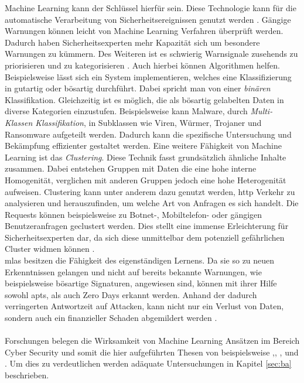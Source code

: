 \documentclass[
    12pt, %
    DIV10,
    ngerman, %
    a4paper, %
    oneside, %
    titlepage, %
    parskip=half, %
    headings=normal, %
    listof=totoc, %
    bibliography=totoc, %
    index=totoc, %
    captions=tableheading, %
    final %
]{scrreprt}
\begin{document}
Machine Learning kann der Schlüssel hierfür sein. Diese Technologie kann für die automatische Verarbeitung von Sicherheitsereignissen genutzt werden \parencite{Singla2019}. Gängige Warnungen können leicht von Machine Learning Verfahren überprüft werden. Dadurch haben Sicherheitsexperten mehr Kapazität sich um besondere Warnungen zu kümmern. Des Weiteren ist es schwierig Warnsignale zusehends zu priorisieren und zu kategorisieren \parencite{JoshuaSaxe2018}. Auch hierbei können Algorithmen helfen. Beispielsweise lässt sich ein System implementieren, welches eine Klassifizierung in gutartig oder bösartig durchführt. Dabei spricht man von einer \emph{binären} Klassifikation. Gleichzeitig ist es möglich, die als bösartig gelabelten Daten in diverse Kategorien einzustufen. Beispielsweise kann Malware, durch \emph{Multi-Klassen Klassifikation}, in Subklassen wie Viren, Würmer, Trojaner und Ransomware aufgeteilt werden. Dadurch kann die spezifische Untersuchung und Bekämpfung effizienter gestaltet werden. Eine weitere Fähigkeit von Machine Learning ist das \emph{Clustering}. Diese Technik fasst grundsätzlich ähnliche Inhalte zusammen. Dabei entstehen Gruppen mit Daten die eine hohe interne Homogenität, verglichen mit anderen Gruppen jedoch eine hohe Heterogenität aufweisen. Clustering kann unter anderem dazu genutzt werden, \ac{http} Verkehr zu analysieren und herauszufinden, um welche Art von Anfragen es sich handelt. Die Requests können beispielsweise zu Botnet-, Mobiltelefon- oder gängigen Benutzeranfragen geclustert werden. Dies stellt eine immense Erleichterung für Sicherheitsexperten dar, da sich diese unmittelbar dem potenziell gefährlichen Cluster widmen können \parencite{JoshuaSaxe2018}. \\\ac{mlas} besitzen die Fähigkeit des eigenständigen Lernens. Da sie so zu neuen Erkenntnissen gelangen und nicht auf bereits bekannte Warnungen, wie beispielsweise bösartige Signaturen, angewiesen sind, können mit ihrer Hilfe sowohl \ac{apts}, als auch Zero Days erkannt werden. Anhand der dadurch verringerten Antwortzeit auf Attacken, kann nicht nur ein Verlust von Daten, sondern auch ein finanzieller Schaden abgemildert werden \parencite{Hu2019}.
\\\\
Forschungen belegen die Wirksamkeit von Machine Learning Ansätzen im Bereich Cyber Security und somit die hier aufgeführten Thesen von beispielsweise \textcite{Homoliak2019},\textcite{Jeong2019}, \textcite{Sabar2018}, \textcite{Brown2018} und \textcite{Yin2017}. Um dies zu verdeutlichen werden adäquate Untersuchungen in Kapitel \ref{sec:ba} beschrieben.
\end{document}
